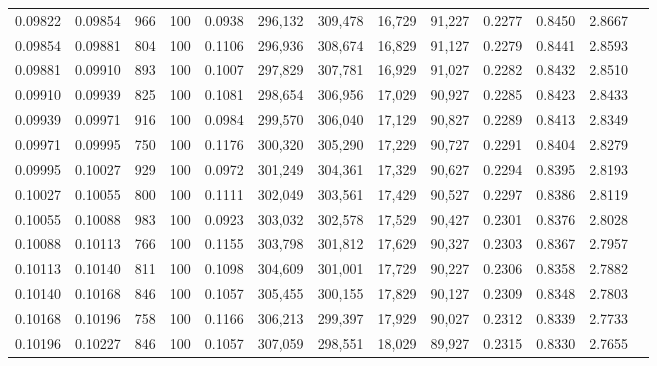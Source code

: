 \begin{tabular}{rrrrrrrrrrrrr}
0.09822 & 0.09854 &   966 & 100 &                                     0.0938 & 296,132 & 309,478 &  16,729 &  91,227 & 0.2277 & 0.8450 & 2.8667 \\
0.09854 & 0.09881 &   804 & 100 &                                     0.1106 & 296,936 & 308,674 &  16,829 &  91,127 & 0.2279 & 0.8441 & 2.8593 \\
0.09881 & 0.09910 &   893 & 100 &                                     0.1007 & 297,829 & 307,781 &  16,929 &  91,027 & 0.2282 & 0.8432 & 2.8510 \\
0.09910 & 0.09939 &   825 & 100 &                                     0.1081 & 298,654 & 306,956 &  17,029 &  90,927 & 0.2285 & 0.8423 & 2.8433 \\
0.09939 & 0.09971 &   916 & 100 &                                     0.0984 & 299,570 & 306,040 &  17,129 &  90,827 & 0.2289 & 0.8413 & 2.8349 \\
0.09971 & 0.09995 &   750 & 100 &                                     0.1176 & 300,320 & 305,290 &  17,229 &  90,727 & 0.2291 & 0.8404 & 2.8279 \\
0.09995 & 0.10027 &   929 & 100 &                                     0.0972 & 301,249 & 304,361 &  17,329 &  90,627 & 0.2294 & 0.8395 & 2.8193 \\
0.10027 & 0.10055 &   800 & 100 &                                     0.1111 & 302,049 & 303,561 &  17,429 &  90,527 & 0.2297 & 0.8386 & 2.8119 \\
0.10055 & 0.10088 &   983 & 100 &                                     0.0923 & 303,032 & 302,578 &  17,529 &  90,427 & 0.2301 & 0.8376 & 2.8028 \\
0.10088 & 0.10113 &   766 & 100 &                                     0.1155 & 303,798 & 301,812 &  17,629 &  90,327 & 0.2303 & 0.8367 & 2.7957 \\
0.10113 & 0.10140 &   811 & 100 &                                     0.1098 & 304,609 & 301,001 &  17,729 &  90,227 & 0.2306 & 0.8358 & 2.7882 \\
0.10140 & 0.10168 &   846 & 100 &                                     0.1057 & 305,455 & 300,155 &  17,829 &  90,127 & 0.2309 & 0.8348 & 2.7803 \\
0.10168 & 0.10196 &   758 & 100 &                                     0.1166 & 306,213 & 299,397 &  17,929 &  90,027 & 0.2312 & 0.8339 & 2.7733 \\
0.10196 & 0.10227 &   846 & 100 &                                     0.1057 & 307,059 & 298,551 &  18,029 &  89,927 & 0.2315 & 0.8330 & 2.7655 \\

\end{tabular}
